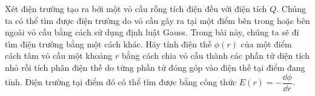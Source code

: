 \begin{vd}
    \label{ca5}
    Xét điện trường tạo ra bởi một vỏ cầu rỗng tích điện đều với điện tích $Q$. Chúng ta có thể tìm được điện trường do vỏ cầu gây ra tại một điểm bên trong hoặc bên ngoài vỏ cầu bằng cách sử dụng định luật Gauss. Trong bài này, chúng ta sẽ đi tìm điện trường bằng một cách khác. Hãy tính điện thế $\phi(r)$ của một điểm cách tâm vỏ cầu một khoảng $r$ bằng cách chia vỏ cầu thành các phần tử diện tích nhỏ rồi tích phân điện thế do từng phần tử đóng góp vào điện thế tại điểm đang tính. Điện trường tại điểm đó có thể tìm được bằng công thức $E(r)=-\dfrac{\dd \phi}{\dd r}$.\\ 
    \begin{center}
        


\begin{tikzpicture}[x=0.75pt,y=0.75pt,yscale=-1,xscale=1]


\end{tikzpicture}
\end{center}
\end{vd}
